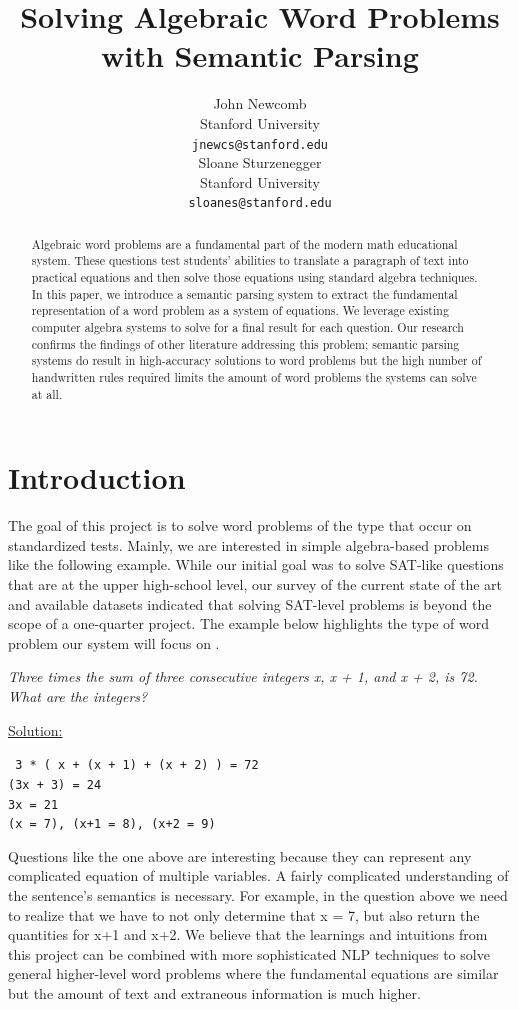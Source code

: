\documentclass[11pt]{article}
\title{Solving Algebraic Word Problems with Semantic Parsing}
\author{John Newcomb \\
  Stanford University \\
  {\tt jnewcs@stanford.edu} \\\And
  Sloane Sturzenegger \\
  Stanford University \\
  {\tt sloanes@stanford.edu} \\}
\date{}
\begin{document}
\maketitle
\begin{abstract}
Algebraic word problems are a fundamental part of the modern math educational system. These questions test students’ abilities to translate a paragraph of text into practical equations and then solve those equations using standard algebra techniques. In this paper, we introduce a semantic parsing system to extract the fundamental representation of a word problem as a system of equations. We leverage existing computer algebra systems to solve for a final result for each question. Our research confirms the findings of other literature addressing this problem; semantic parsing systems do result in high-accuracy solutions to word problems but the high number of handwritten rules required limits the amount of word problems the systems can solve at all.
\end{abstract}

\section{Introduction}
The goal of this project is to solve word problems of the type that occur on standardized tests. Mainly, we are interested in simple algebra-based problems like the following example. While our initial goal was to solve SAT-like questions that are at the upper high-school level, our survey of the current state of the art and available datasets indicated that solving SAT-level problems is beyond the scope of a one-quarter project. The example below highlights the type of word problem our system will focus on \cite{Shi:15}.

\textit{Three times the sum of three consecutive integers x, x + 1, and x + 2, is 72. What are the integers?}

\underline{Solution:}
\begin{center}
    \small{\texttt{
        3 * ( x + (x + 1) + (x + 2) ) = 72\\
        (3x + 3) = 24\\
        3x = 21\\
        (x = 7), (x+1 = 8), (x+2 = 9)
    }}
\end{center}

Questions like the one above are interesting because they can represent any complicated equation of multiple variables. A fairly complicated understanding of the sentence’s semantics is necessary. For example, in the question above we need to realize that we have to not only determine that x = 7, but also return the quantities for x+1 and x+2. We believe that the learnings and intuitions from this project can be combined with more sophisticated NLP techniques to solve general higher-level word problems where the fundamental equations are similar but the amount of text and extraneous information is much higher.
\end{document}

